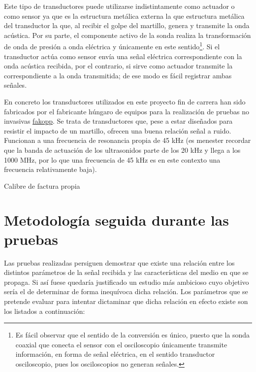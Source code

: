 Este tipo de transductores puede utilizarse indistintamente como actuador o
como sensor ya que es la estructura metálica externa la que estructura
metálica del transductor la que, al recibir el golpe del martillo, genera y
transmite la onda acústica. Por su parte, el componente activo de la sonda
realiza la transformación de onda de presión a onda eléctrica y únicamente
en este sentido\footnote{Es fácil observar que el sentido de la conversión
es único, puesto que la sonda coaxial que conecta el sensor con el
osciloscopio únicamente transmite información, en forma de señal eléctrica,
en el sentido transductor osciloscopio, pues los osciloscopios no generan
señales.}. Si el transductor actúa como sensor envía una señal eléctrica
correspondiente con la onda acústica recibida, por el contrario, si sirve
como actuador transmite la correspondiente a la onda transmitida; de ese
modo es fácil registrar ambas señales.

En concreto los transductores utilizados en este proyecto fin de carrera
han sido fabricados por el fabricante húngaro de equipos para la
realización de pruebas no invasivas
\href{www.fakopp.com/site/piezo}{fakopp}. Se trata de transductores que,
pese a estar diseñados para resistir el impacto de un martillo, ofrecen una
buena relación señal a ruido. Funcionan a una frecuencia de resonancia
propia de 45 kHz (es menester recordar que la banda de actuación de los
ultrasonidos parte de los 20 kHz y llega a los 1000 MHz, por lo que una
frecuencia de 45 kHz es en este contexto una frecuencia relativamente
baja).

Calibre de factura propia


\section{Metodología seguida durante las pruebas}

Las pruebas realizadas persiguen demostrar que existe una relación entre
los distintos parámetros de la señal recibida y las características del
medio en que se propaga. Si así fuese quedaría justificado un estudio más
ambicioso cuyo objetivo sería el de determinar de forma inequívoca dicha
relación. Los parámetros que se pretende evaluar para intentar dictaminar
que dicha relación en efecto existe son los listados a continuación:

